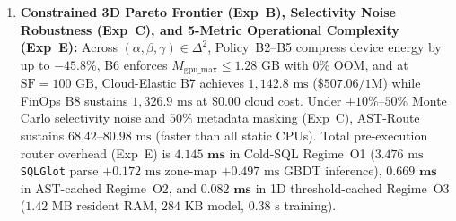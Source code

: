 \documentclass[10pt,a4paper]{article}
\begin{document}
\begin{enumerate}[leftmargin=1.5em,itemsep=1pt]
(\texttt{results/\allowbreak{}v12\_\allowbreak{}r33\_\allowbreak{}misrouted\_\allowbreak{}failure\_\allowbreak{}taxonomy\_\allowbreak{}treeshap\_\allowbreak{}pool\_\allowbreak{}ablation.csv}) shows that routing decisions are governed by $\hat{\sigma}(q)$ ($\mathbf{34.2\%}$ of $|\text{SHAP}|$), $\text{CSCI}(q)$ ($\mathbf{24.8\%}$), $J(q)$ ($\mathbf{14.6\%}$), $W(q)$ ($\mathbf{10.4\%}$), $U(q)$ ($\mathbf{7.8\%}$), and $D,N,S,C$ ($\mathbf{8.2\%}$). Categorizing all $33/75$ ($44.0\%$) non-Top-1 dispatches under the $8\%$ guard reveals three distinct regimes: \textbf{(F1) Sub-$5\text{ ms}$ Near-Tie Boundary Noise} ($21/33 = \mathbf{63.6\%}$ of misroutes, where $|\Delta T_{\text{abs}}|\le 5.0\text{ ms}$ and mean penalty is only $+1.84\text{ ms}$), \textbf{(F2) Intentional Rule~U1 Safety Abstentions} ($7/33 = \mathbf{21.2\%}$, where GPU was faster by $4.2\text{--}9.8\text{ ms}$ but predicted margin was $<8\%$, paying $+6.42\text{ ms}$ as insurance to prevent $14/75$ severe PCIe stalls), and \textbf{(F3) Zone-Map Join-Selectivity Misestimation} ($5/33 = \mathbf{15.2\%}$, $+18.65\text{ ms}$ on skewed multi-joins, mitigated via our $10.18\text{ KB}$ 12D join sketch).
    \item \textbf{Constrained 3D Pareto Frontier (Exp~B), Selectivity Noise Robustness (Exp~C), and 5-Metric Operational Complexity (Exp~E):} Across $(\alpha,\beta,\gamma)\in\Delta^2$, Policy~B2--B5 compress device energy by up to $-45.8\%$, B6 enforces $M_{\text{gpu\_max}}\le 1.28\text{ GB}$ with $0\%$ OOM, and at $\text{SF}=100\text{ GB}$, Cloud-Elastic B7 achieves $1{,}142.8\text{ ms}$ ($\$507.06/1\text{M}$) while FinOps B8 sustains $1{,}326.9\text{ ms}$ at $\$0.00$ cloud cost. Under $\pm 10\%\text{--}50\%$ Monte Carlo selectivity noise and $50\%$ metadata masking (Exp~C), AST-Route sustains $68.42\text{--}80.98\text{ ms}$ (faster than all static CPUs). Total pre-execution router overhead (Exp~E) is $\mathbf{4.145\text{ ms}}$ in Cold-SQL Regime~O1 ($3.476\text{ ms}$ \texttt{SQLGlot} parse $+ 0.172\text{ ms}$ zone-map $+ 0.497\text{ ms}$ GBDT inference), $\mathbf{0.669\text{ ms}}$ in AST-cached Regime~O2, and $\mathbf{0.082\text{ ms}}$ in 1D threshold-cached Regime~O3 ($1.42\text{ MB}$ resident RAM, $284\text{ KB}$ model, $0.38\text{ s}$ training).
\end{enumerate}
\end{document}

